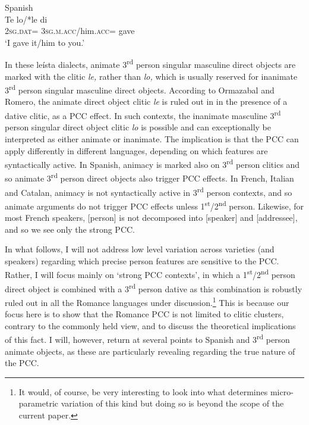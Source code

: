 \documentclass[output=paper,colorlinks,citecolor=brown,nonflat]{./langscibook}
\begin{document}
\ea%
    \label{ex:sheehan:8}
    Spanish \citep[321]{OrmazabalRomero2007}\\
    \gll    Te     lo/*le     di  \\
            \textsc{2sg}.\textsc{dat}=  \textsc{3sg.m.acc}/him.\textsc{acc}=  gave\\
    \glt    ‘I gave it/him to you.’
\z

In these leísta dialects, animate 3\textsuperscript{rd} person singular masculine direct objects are marked with the clitic \textit{le,} rather than \textit{lo,} which is usually reserved for inanimate 3\textsuperscript{rd} person singular masculine direct objects. According to Ormazabal and Romero, the animate direct object clitic \textit{le} is ruled out in  in the presence of a dative clitic, as a PCC effect. In such contexts, the inanimate masculine 3\textsuperscript{rd} person singular direct object clitic \textit{lo} is possible and can exceptionally be interpreted as either animate or inanimate. The implication is that the PCC can apply differently in different languages, depending on which features are syntactically active. In Spanish, animacy is marked also on 3\textsuperscript{rd} person clitics and so animate 3\textsuperscript{rd} person direct objects also trigger PCC effects. In French, Italian and Catalan, animacy is not syntactically active in 3\textsuperscript{rd} person contexts, and so animate arguments do not trigger PCC effects unless 1\textsuperscript{st}/2\textsuperscript{nd} person. Likewise, for most French speakers, [person] is not decomposed into [speaker] and [addressee], and so we see only the strong PCC.

In what follows, I will not address low level variation across varieties (and speakers) regarding which precise person features are sensitive to the PCC. Rather, I will focus mainly on ‘strong PCC contexts’, in which a 1\textsuperscript{st}/2\textsuperscript{nd} person direct object is combined with a 3\textsuperscript{rd} person dative as this combination is robustly ruled out in all the Romance languages under discussion.\footnote{It would, of course, be very interesting to look into what determines micro-parametric variation of this kind but doing so is beyond the scope of the current paper.}  This is because our focus here is to show that the Romance PCC is not limited to clitic clusters, contrary to the commonly held view, and to discuss the theoretical implications of this fact. I will, however, return at several points to Spanish and 3\textsuperscript{rd} person animate objects, as these are particularly revealing regarding the true nature of the PCC. 
\end{document}
